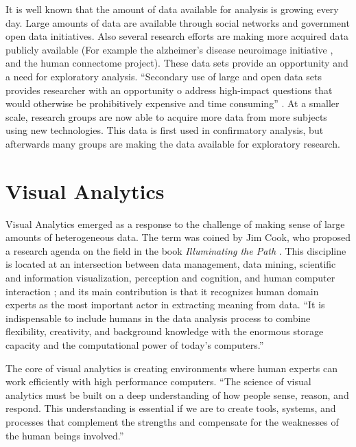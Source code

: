 It is well known that the amount of data available for analysis is growing every day. Large amounts of data are available through social networks and government open data initiatives. Also several research efforts are making more acquired data publicly available (For example the alzheimer's disease neuroimage initiative \autocite{jack_alzheimers_2008}, and the human connectome project\autocite{marcus_human_2013}). These data sets provide an opportunity and a need for exploratory analysis. ``Secondary use of large and open data sets provides researcher with an opportunity o address high-impact questions that would otherwise be prohibitively expensive and time consuming'' \autocite{viangteeravat_giving_2014}. At a smaller scale, research groups are now able to acquire more data from more subjects using new technologies. This data is first used in confirmatory analysis, but afterwards many groups are making the data available for exploratory research. 

\section{Visual Analytics}

%

Visual Analytics emerged as a response to the challenge of making sense of large amounts of heterogeneous data. The term was coined by Jim Cook, who proposed a research agenda on the field in the book \emph{Illuminating the Path} \autocite{cook_illuminating_2005}. This discipline is located at an intersection between data management, data mining, scientific and information visualization, perception and cognition, and human computer interaction \autocite{keim_visual_2008}; and its main contribution is that it recognizes human domain experts as the most important actor in extracting meaning from data.
``It is indispensable to include humans in the data analysis process to combine flexibility, creativity, and background knowledge with the enormous storage capacity and the computational power of today’s computers.'' \autocite{keim_visual_2008}

The core of visual analytics is creating environments where human experts can work efficiently with high performance computers.
``The science of visual analytics must be built on a deep understanding of how
people sense, reason, and respond. This understanding is essential if we are to create
tools, systems, and processes that complement the strengths and compensate for the
weaknesses of the human beings involved.'' \autocite{cook_illuminating_2005}

